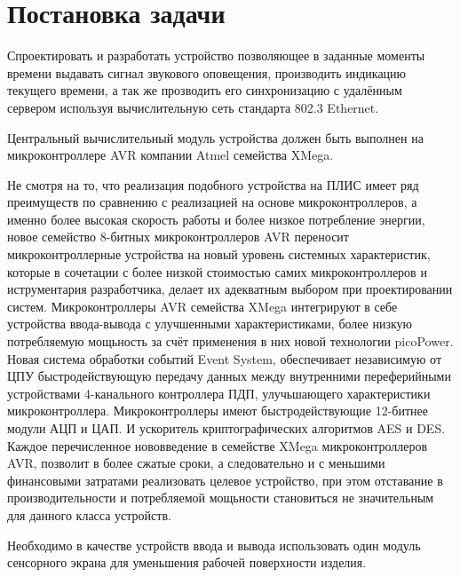 \section{Постановка задачи}
\begin{par}
Спроектировать и разработать устройство позволяющее в заданные моменты времени выдавать сигнал
звукового оповещения, производить индикацию текущего времени, а так же прозводить его синхронизацию
с удалённым сервером используя вычислительную сеть стандарта 802.3 Ethernet.
\end{par}

\begin{par}
Центральный вычислительный модуль устройства должен быть выполнен на микроконтроллере AVR компании
Atmel семейства XMega.
\end{par}

\begin{par}
Не смотря на то, что реализация подобного устройства на ПЛИС имеет ряд преимуществ по
сравнению с реализацией на основе микроконтроллеров, а именно более высокая скорость
работы и более низкое потребление энергии, новое семейство 8-битных микроконтроллеров
AVR переносит микроконтроллерные устройства на новый уровень системных характеристик,
которые в сочетации с более низкой стоимостью самих микроконтроллеров и иструментария
разработчика, делает их адекватным выбором при проектировании систем. Микроконтроллеры
AVR семейства XMega интегрируют в себе устройства ввода-вывода с улучшенными характеристиками,
более низкую потребляемую мощьность за счёт применения в них новой технологии picoPower.
Новая система обработки событий Event System, обеспечивает независимую от ЦПУ
быстродействующую передачу данных между внутренними переферийными устройствами 4-канального
контроллера ПДП, улучьшающего характеристики микроконтроллера. Микроконтроллеры имеют
быстродействующие 12-битнее модули АЦП и ЦАП. И ускоритель криптографических алгоритмов AES и DES.
Каждое перечисленное нововведение в семействе XMega микроконтроллеров AVR, позволит
в более сжатые сроки, а следовательно и с меньшими финансовыми затратами реализовать
целевое устройство, при этом отставание в производительности и потребляемой мощьности
становиться не значительным для данного класса устройств.
\end{par}

\begin{par}
Необходимо в качестве устройств ввода и вывода использовать один модуль сенсорного экрана
для уменьшения рабочей поверхности изделия.
\end{par}

